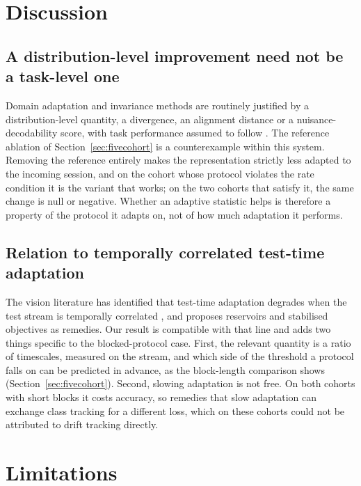\documentclass[a4paper,fleqn]{cas-dc}
\begin{document}
\section{Discussion}
\label{sec:discussion}

\subsection{A distribution-level improvement need not be a task-level one}

Domain adaptation and invariance methods are routinely justified by a distribution-level quantity, a divergence, an alignment distance or a nuisance-decodability score, with task performance assumed to follow \citep{ganin,long,coral,bendavid}. The reference ablation of Section~\ref{sec:fivecohort} is a counterexample within this system. Removing the reference entirely makes the representation strictly less adapted to the incoming session, and on the cohort whose protocol violates the rate condition it is the variant that works; on the two cohorts that satisfy it, the same change is null or negative. Whether an adaptive statistic helps is therefore a property of the protocol it adapts on, not of how much adaptation it performs.

\subsection{Relation to temporally correlated test-time adaptation}

The vision literature has identified that test-time adaptation degrades when the
test stream is temporally correlated \citep{note,sar,cotta}, and proposes
reservoirs and stabilised objectives as remedies. Our result is compatible with
that line and adds two things specific to the blocked-protocol case. First, the
relevant quantity is a ratio of timescales, measured on the stream, and which side of the threshold a protocol falls on can be predicted in advance, as the block-length comparison shows (Section~\ref{sec:fivecohort}). Second, slowing adaptation is not free. On both cohorts with short blocks it
costs accuracy, so remedies that slow adaptation can exchange class tracking for
a different loss, which on these cohorts could not be attributed to drift
tracking directly.

\section{Limitations}
\label{sec:limits}
\end{document}
